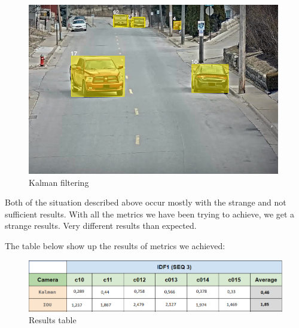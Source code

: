 \documentclass[journal, a4paper]{IEEEtran}
\begin{document}
\begin{figure}[ht] \centering
\includegraphics[scale=0.9]{images/img3.PNG}   
\caption{\label{fig:img3} Kalman filtering}
\end{figure}

Both of the situation described above occur mostly with the strange and not sufficient results. With all the metrics we have been trying to achieve, we get a strange results. Very different results than expected.

The table below show up the results of metrics we achieved: 

\begin{figure}[ht] \centering
\includegraphics[scale=0.45]{images/img4.png}   
\caption{\label{fig:img4} Results table}
\end{figure}
\end{document}
